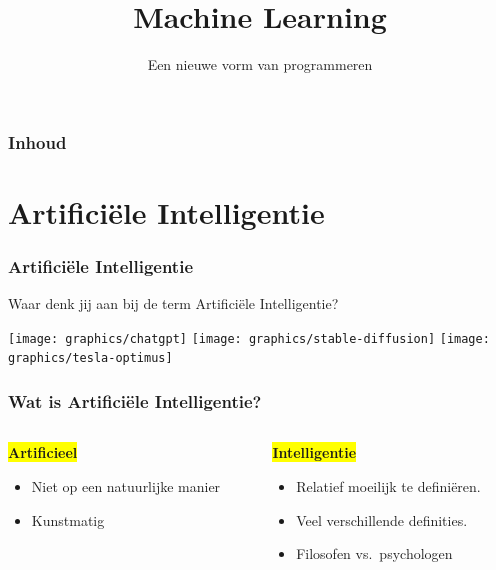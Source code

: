 \documentclass[aspectratio=169]{beamer}
\title{Machine Learning}
\subtitle{Een nieuwe vorm van programmeren}
\author{\lecturers}    %
\date{\academicyear}   %
\begin{document}
\begin{frame}
  \maketitle
\end{frame}

\begin{frame}
  \frametitle{Inhoud}

  \tableofcontents
\end{frame}

\section{Artifici\"ele Intelligentie}

\begin{frame}
\frametitle{Artifici\"ele Intelligentie}

Waar denk jij aan bij de term Artifici\"ele Intelligentie?

\vspace{1cm}

\pause
\texttt{[image: graphics/chatgpt]}
\texttt{[image: graphics/stable-diffusion]}
\texttt{[image: graphics/tesla-optimus]}

\end{frame}

\begin{frame}
\frametitle{Wat is Artifici\"ele Intelligentie?}
\begin{columns}
	\begin{column}{0.5\textwidth}
		\begin{center}
	\colorbox{yellow}{\Large{\textbf{Artificieel}}}
	\begin{itemize}
		\item Niet op een natuurlijke manier
		\item Kunstmatig
	\end{itemize}
	\end{center}
	\end{column}
	\begin{column}{0.5\textwidth}  %
		\begin{center}
			\colorbox{yellow}{\Large{\textbf{Intelligentie}}}
		\end{center}
	\begin{itemize}
		\item Relatief moeilijk te defini\"eren.
		\item Veel verschillende definities.
		\item Filosofen vs.\ psychologen
	\end{itemize}
	\end{column}
\end{columns}
\end{frame}
\end{document}
